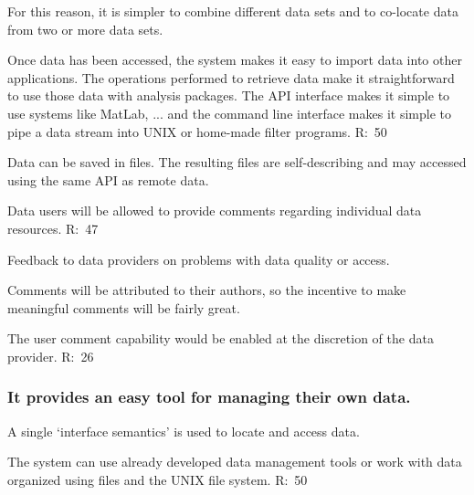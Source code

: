 \begin{list}{}{}
\begin{list}{--}{}
\item For this reason, it is simpler to combine different data sets and
      to co-locate data from two or more data sets. 

\item Once data has been accessed, the system makes it easy to import data 
      into other applications. The operations performed to retrieve
      data make it straightforward to use those data with analysis
      packages. The API interface makes it simple to use systems like
      MatLab, ... and the command line interface makes it simple to
      pipe a data stream into UNIX or home-made filter programs. 
      R:~50

\item Data can be saved in files. The resulting files are self-describing
      and may accessed using the same API as remote data.

\item Data users will be allowed to provide comments regarding individual 
      data resources.
      R:~47

\begin{list}{--}{}

     \item Feedback to data providers on problems with data quality or
           access. 

     \item Comments will be attributed to their authors, so the incentive to 
           make meaningful comments will be fairly great.

     \item The user comment capability would be enabled at the discretion of
           the data provider.
           R:~26
\end{list}

\end{list}

\subsubsection {It provides an easy tool for managing their own data.}

\begin{list}{.}{}

\item A single `interface semantics' is used to locate and access data.

\item The system can use already developed data management tools or work
       with data organized using files and the UNIX file system.
       R:~50


\end{list}
\end{list}
